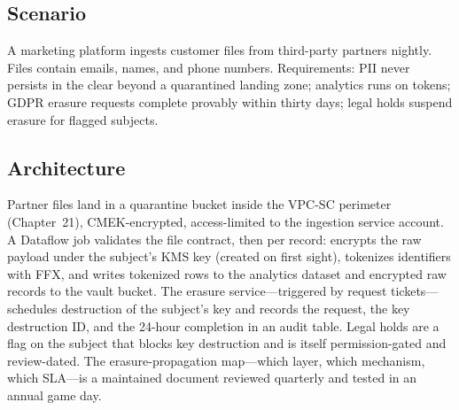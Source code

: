 \subsection{Scenario}
A marketing platform ingests customer files from third-party partners nightly. Files contain emails, names, and phone numbers. Requirements: PII never persists in the clear beyond a quarantined landing zone; analytics runs on tokens; GDPR erasure requests complete provably within thirty days; legal holds suspend erasure for flagged subjects.

\subsection{Architecture}
Partner files land in a quarantine bucket inside the VPC-SC perimeter (Chapter~21), CMEK-encrypted, access-limited to the ingestion service account. A Dataflow job validates the file contract, then per record: encrypts the raw payload under the subject's KMS key (created on first sight), tokenizes identifiers with FFX, and writes tokenized rows to the analytics dataset and encrypted raw records to the vault bucket. The erasure service---triggered by request tickets---schedules destruction of the subject's key and records the request, the key destruction ID, and the 24-hour completion in an audit table. Legal holds are a flag on the subject that blocks key destruction and is itself permission-gated and review-dated. The erasure-propagation map---which layer, which mechanism, which SLA---is a maintained document reviewed quarterly and tested in an annual game day.

